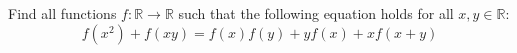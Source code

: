 Find all functions $f\colon\mathbb{R} \rightarrow \mathbb{R}$ such that the following equation
holds for all $x,y \in \mathbb{R}$:
$$f(x^2) + f(xy)=f(x)f(y)+yf(x)+xf(x+y)$$